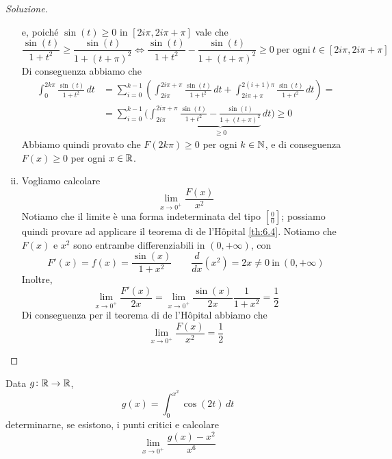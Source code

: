 \begin{proof}[Soluzione]
\begin{enumerate}[(i)]
\[        \]
        e, poiché $\sin(t)\ge 0$ in $[2i\pi, 2i\pi+\pi]$ vale che 
        \[
        \frac{\sin(t)}{1+t^2}\ge \frac{\sin(t)}{1+(t+\pi)^2} \iff \frac{\sin(t)}{1+t^2}- \frac{\sin(t)}{1+(t+\pi)^2}\ge 0 \ \text{per ogni} \ t\in[2i\pi, 2i\pi + \pi]
        \]
        Di conseguenza abbiamo che
        \[
        \begin{split}
            \int_0^{2k\pi} \frac{\sin(t)}{1+t^2}\, dt & = \sum_{i=0}^{k-1} \left({\int_{2i\pi}^{2i\pi +\pi} \frac{\sin(t)}{1+t^2}\, dt} + {\int_{2i\pi + \pi }^{2(i+1)\pi} \frac{\sin(t)}{1+t^2}\, dt}\right) = \\
            & = \sum_{i=0}^{k-1} \bigg(\int_{2i\pi}^{2i\pi +\pi} \underbrace{\frac{\sin(t)}{1+t^2} - \frac{\sin(t)}{1+(t+\pi)^2}}_{\ge 0}\, dt\bigg)\ge 0
        \end{split}
        \]
        Abbiamo quindi provato che $F(2k\pi)\ge 0$ per ogni $k\in\amsbb{N}$, e di conseguenza $F(x)\ge 0$ per ogni $x\in\amsbb{R}$.
        \item Vogliamo calcolare 
        \[
        \lim_{x\to 0^+} \frac{F(x)}{x^2}
        \]
        Notiamo che il limite è una forma indeterminata del tipo $\left[\frac{0}{0}\right]$; possiamo quindi provare ad applicare il teorema di de l'H{\^o}pital \ref{th:6.4}. Notiamo che $F(x)$ e $x^2$ sono entrambe differenziabili in $(0,+\infty)$, con
        \[
        F'(x) = f(x) = \frac{\sin(x)}{1+x^2} \qquad \frac{d}{dx}(x^2) = 2x\ne 0 \ \text{in} \ (0,+\infty)
        \]
        Inoltre,
        \[
        \lim_{x\to 0^+} \frac{F'(x)}{2x} = \lim_{x\to 0^+} \frac{\sin(x)}{2x}\frac{1}{1+x^2} = \frac{1}{2}
        \]
        Di conseguenza per il teorema di de l'H{\^o}pital abbiamo che
        \[
        \lim_{x\to 0^+} \frac{F(x)}{x^2} = \frac{1}{2}
        \]
    \end{enumerate}
\end{proof}
\begin{exercise}
    \label{ex:9.2}
    Data $g\colon \amsbb{R}\to \amsbb{R}$,
    \[
    g(x) = \int_0^{x^2}\cos(2t)\, dt
    \]
    determinarne, se esistono, i punti critici e calcolare 
    \[
    \lim_{x\to 0^+} \frac{g(x)-x^2}{x^6}
    \]
\end{exercise}
